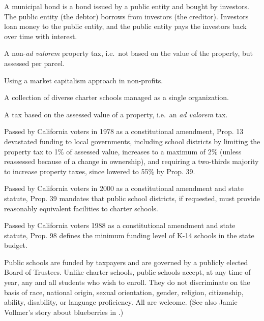 \begin{description}[nosep]
\medskip\item[municipal bond] A municipal bond is a bond issued by a public entity and bought by investors. The public entity (the debtor) borrows from investors (the creditor). Investors loan money to the public entity, and the public entity pays the investors back over time with interest. \parencite{Chen2022}

\medskip\item[parcel tax] A non-\textit{ad valorem} property tax, i.e.~not based on the value of the property, but assessed per parcel. \parencite{Lu2019}

\medskip\item[philanthrocapitalism] Using a market capitalism approach in non-profits. \parencite{Giridharadas2018}

\medskip\item[portfolio school district] A collection of diverse charter schools managed as a single organization. \parencite{Lake.Hernandez2011}

\medskip\item[property tax] A tax based on the assessed value of a property, i.e.~an \textit{ad valorem} tax. \parencite{BOE2018}

\medskip\item[Proposition 13] Passed by California voters in 1978 as a constitutional amendment, Prop. 13 devastated funding to local governments, including school districts by limiting the property tax to 1\% of assessed value, increases to a maximum of 2\% (unless reassessed because of a change in ownership), and requiring a two-thirds majority to increase property taxes, since lowered to 55\% by Prop. 39. \parencite{Aguinaldo.etal2022a}

\medskip\item[Proposition 39] Passed by California voters in 2000 as a constitutional amendment and state statute, Prop. 39 mandates that public school districts, if requested, must provide reasonably equivalent facilities to charter schools. \parencite{Aguinaldo.etal2022a}

\medskip\item[Proposition 98] Passed by California voters 1988 as a constitutional amendment and state statute, Prop. 98 defines the minimum funding level of K-14 schools in the state budget. \parencite{Aguinaldo.etal2022a}

\medskip\item[public school] Public schools are funded by taxpayers and are governed by a publicly elected Board of Trustees. Unlike charter schools, public schools accept, at any time of year, any and all students who wish to enroll. They do not discriminate on the basis of race, national origin, sexual orientation, gender, religion, citizenship, ability, disability, or language proficiency. All are welcome. \parencite{CDE2023b} (See also Jamie Vollmer's story about blueberries in \textcite{Vollmer2011}.)


\end{description}
